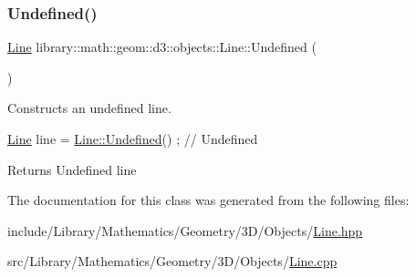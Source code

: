 \subsubsection{\texorpdfstring{Undefined()}{Undefined()}}
{\footnotesize\ttfamily \hyperlink{classlibrary_1_1math_1_1geom_1_1d3_1_1objects_1_1_line}{Line} library\+::math\+::geom\+::d3\+::objects\+::\+Line\+::\+Undefined (\begin{DoxyParamCaption}{ }\end{DoxyParamCaption})\hspace{0.3cm}{\ttfamily [static]}}



Constructs an undefined line. 


\begin{DoxyCode}
\hyperlink{classlibrary_1_1math_1_1geom_1_1d3_1_1objects_1_1_line_a762e529453ff9ffa9233fd73737f4692}{Line} line = \hyperlink{classlibrary_1_1math_1_1geom_1_1d3_1_1objects_1_1_line_a6e80b434196ee84bc74154532989c18c}{Line::Undefined}() ; \textcolor{comment}{// Undefined}
\end{DoxyCode}


\begin{DoxyReturn}{Returns}
Undefined line 
\end{DoxyReturn}


The documentation for this class was generated from the following files\+:\begin{DoxyCompactItemize}
\item 
include/\+Library/\+Mathematics/\+Geometry/3\+D/\+Objects/\hyperlink{_line_8hpp}{Line.\+hpp}\item 
src/\+Library/\+Mathematics/\+Geometry/3\+D/\+Objects/\hyperlink{_line_8cpp}{Line.\+cpp}\end{DoxyCompactItemize}
